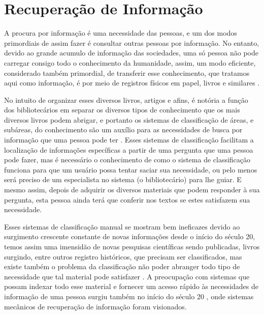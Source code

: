 \section{Recuperação de Informação} \label{sec:RecuperaçãoInformação}




A procura por informação é uma necessidade das pessoas, e um dos modos primordiais de assim fazer é consultar outras pessoas por informação.
No entanto, devido ao grande acumulo de informação das sociedades, uma só pessoa não pode carregar consigo todo o conhecimento da humanidade, assim, um modo eficiente, considerado também primordial, de transferir esse conhecimento, que tratamos aqui como informação, é por meio de registros físicos em papel, livros e similares \cite[p.~1]{Grossman2004IRAH}.

No intuito de organizar esses diversos livros, artigos e afins, é notória a função dos bibliotecários em separar os diversos tipos de conhecimento que os mais diversos livros podem abrigar, e portanto os sistemas de classificação de áreas, e subáreas, do conhecimento são um auxílio para as necessidades de busca por informação que uma pessoa pode ter \cite[p.~1]{Manning2008IIR}\cite[p.~1446]{Sanderson2012THIRR}. 
Esses sistemas de classificação facilitam a localização de informações específicas a partir de uma pergunta que uma pessoa pode fazer, mas é necessário o conhecimento de como o sistema de classificação funciona para que um usuário possa tentar saciar sua necessidade, ou pelo menos será preciso de um especialista no sistema (o bibliotecário) para lhe guiar.
E mesmo assim, depois de adquirir os diversos materiais que podem responder à sua pergunta, esta pessoa ainda terá que conferir nos textos se estes satisfazem sua necessidade.


Esses sistemas de classificação manual se mostram bem ineficazes devido ao surgimento crescente constante de novas informações desde o início do século 20, temos assim uma imensidão de novas pesquisas científicas sendo publicadas, livros surgindo, entre outros registro históricos, que precisam ser classificados, mas existe também o problema da classificação não poder abranger todo tipo de necessidade que tal material pode satisfazer \cite[p.~1444]{Sanderson2012THIRR}. 
A preocupação com sistemas que possam indexar todo esse material e fornecer um acesso rápido às necessidades de informação de uma pessoa surgiu também no início do século 20 \cite{Bush:1979:WMT:1113634.1113638}, onde sistemas mecânicos de recuperação de informação foram visionados.


